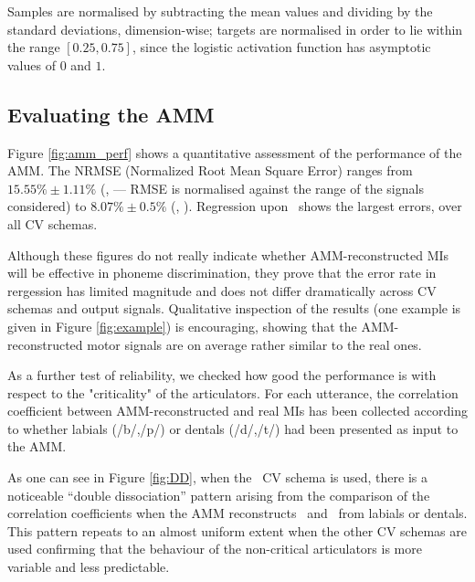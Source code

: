 Samples are normalised by subtracting the mean values
and dividing by the standard deviations, dimension-wise; targets are
normalised in order to lie within the range $[0.25,0.75]$, since the
logistic activation function has asymptotic values of $0$ and $1$.

\subsection{Evaluating the AMM}
\label{subsec:amm_results}

Figure \ref{fig:amm_perf} shows a quantitative assessment of the performance
of the AMM. The NRMSE (Normalized Root Mean Square Error) ranges from $15.55\% \pm 1.11\%$ (\vlio, \coa ---
RMSE is normalised against the range of the signals considered) to
$8.07\% \pm 0.5\%$ (\vttu, \spkc). Regression upon \vlio\ shows the largest
errors, over all CV schemas.

Although these figures do not really indicate whether AMM-reconstructed MIs will be
effective in phoneme discrimination, they prove that the error rate in rergession has
limited magnitude and does not differ dramatically across CV schemas and output signals.
Qualitative inspection of the results (one example is given in Figure \ref{fig:example})
is encouraging, showing that the AMM-reconstructed motor signals are on average rather
similar to the real ones.

As a further test of reliability, we checked how good the performance is with respect to the "criticality"
of the articulators. For each utterance,
the correlation coefficient between AMM-reconstructed and real MIs has been collected
according to whether labials (/b/,/p/) or dentals (/d/,/t/) had been presented as input
to the AMM.

As one can see in Figure \ref{fig:DD}, when the \overall\ CV schema is used,
there is a noticeable ``double dissociation''
pattern arising from the comparison of the correlation coefficients when the AMM
reconstructs \vlio\ and \vttu\ from labials or dentals. This pattern repeats to an
almost uniform extent when the other CV schemas are used confirming that the behaviour
of the non-critical articulators is more variable and less predictable.

%
